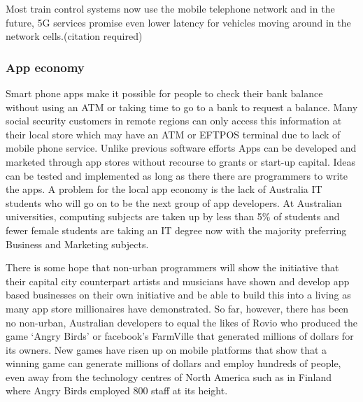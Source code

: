 Most train control systems now use the mobile telephone network and in the future, 5G services promise even lower latency for vehicles moving around in the network cells.(citation required)

\subsubsection{App economy}
Smart phone apps make it possible for people to check their bank balance without using an ATM or taking time to go to a bank to request a balance. Many social security customers in remote regions can only access this information at their local store which may have an ATM or EFTPOS terminal due to lack of mobile phone service. 
Unlike previous software efforts Apps can be developed and marketed through app stores without recourse to grants or start-up capital. Ideas can be tested and implemented as long as there there are programmers to write the apps. A problem for the local app economy is the lack of Australia IT students who will go on to be the next group of app developers. At Australian universities, computing subjects are taken up by less than 5\% of students and fewer female students are taking an IT degree now with the majority preferring Business and Marketing subjects.\cite{RefWorks:191}

There is some hope that non-urban programmers will show the initiative that their capital city counterpart artists and musicians have shown and develop  app based businesses on their own initiative and be able to build this into a living as many app store millionaires have demonstrated. So far, however, there has been no non-urban, Australian developers to equal the likes of Rovio who produced the game `Angry Birds' or facebook's FarmVille that generated millions of dollars for its owners. New games have risen up on mobile platforms that show that a winning game can generate millions of dollars and employ hundreds of people, even  away from the technology centres of North America such as in Finland where Angry Birds employed 800 staff at its height.\cite{RefWorks:192} 

